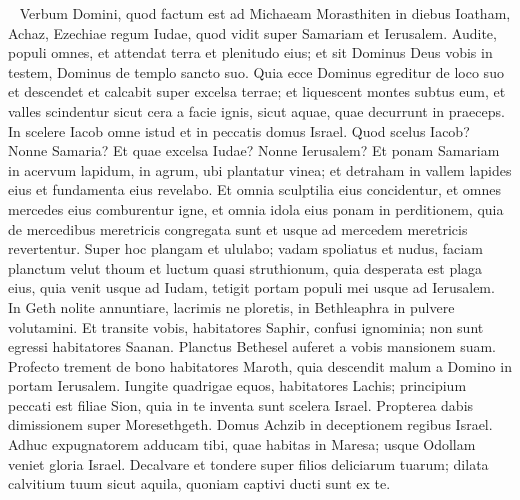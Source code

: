 
\begin{biblechapter}   
\verse Verbum Domini, quod factum est ad Michaeam Morasthiten in diebus Ioatham, Achaz, Ezechiae regum Iudae, quod vidit super Samariam et Ierusalem. 
\verse Audite, populi omnes, et attendat terra et plenitudo eius; et sit Dominus Deus vobis in testem, Dominus de templo sancto suo. 
\verse Quia ecce Dominus egreditur de loco suo et descendet et calcabit super excelsa terrae; 
\verse et liquescent montes subtus eum, et valles scindentur sicut cera a facie ignis, sicut aquae, quae decurrunt in praeceps. 
\verse In scelere Iacob omne istud et in peccatis domus Israel. Quod scelus Iacob? Nonne Samaria? Et quae excelsa Iudae? Nonne Ierusalem? 
\verse Et ponam Samariam in acervum lapidum, in agrum, ubi plantatur vinea; et detraham in vallem lapides eius et fundamenta eius revelabo. 
\verse Et omnia sculptilia eius concidentur, et omnes mercedes eius comburentur igne, et omnia idola eius ponam in perditionem, quia de mercedibus meretricis congregata sunt et usque ad mercedem meretricis revertentur. 
\verse Super hoc plangam et ululabo; vadam spoliatus et nudus, faciam planctum velut thoum et luctum quasi struthionum, 
\verse quia desperata est plaga eius, quia venit usque ad Iudam, tetigit portam populi mei usque ad Ierusalem. 
\verse In Geth nolite annuntiare, lacrimis ne ploretis, in Bethleaphra in pulvere volutamini. 
\verse Et transite vobis, habitatores Saphir, confusi ignominia; non sunt egressi habitatores Saanan. Planctus Bethesel auferet a vobis mansionem suam. 
\verse Profecto trement de bono habitatores Maroth, quia descendit malum a Domino in portam Ierusalem. 
\verse Iungite quadrigae equos, habitatores Lachis; principium peccati est filiae Sion, quia in te inventa sunt scelera Israel. 
\verse Propterea dabis dimissionem super Moresethgeth. Domus Achzib in deceptionem regibus Israel. 
\verse Adhuc expugnatorem adducam tibi, quae habitas in Maresa; usque Odollam veniet gloria Israel. 
\verse Decalvare et tondere super filios deliciarum tuarum; dilata calvitium tuum sicut aquila, quoniam captivi ducti sunt ex te. 
\end{biblechapter}

